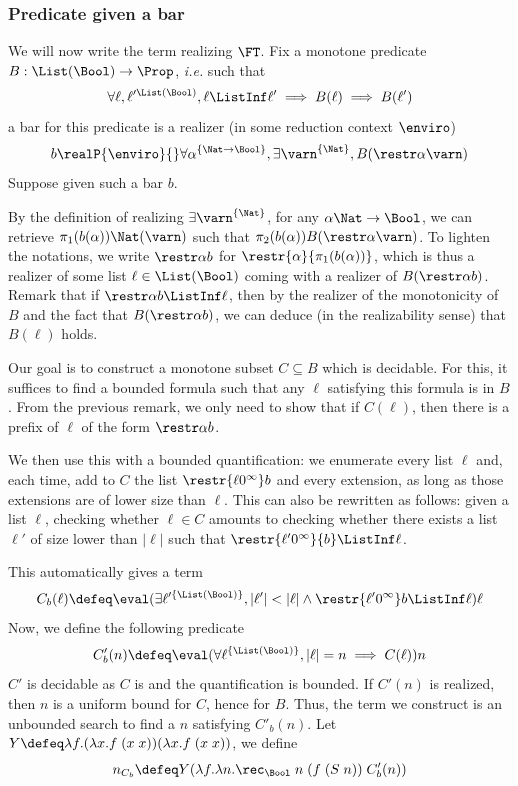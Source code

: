 \subsubsection{Predicate given a bar}

We will now write the term realizing $\FT$.
Fix a monotone predicate $B : \List(\Bool) \to \Prop$, \textit{i.e.} such that
\[\forall \ell, \ell'^{\List(\Bool)}, \ell \ListInf \ell' \implies B(\ell) \implies B(\ell')\]
a bar for this predicate is a realizer (in some reduction context $\enviro$)
\[b \realP{\enviro}{} \forall \alpha^{\{\Nat \to \Bool\}}, \exists \varn^{\{\Nat\}}, B(\restr \alpha \varn)\]
Suppose given such a bar $b$.

By the definition of realizing $\exists \varn^{\{\Nat\}}$, for any $\alpha \real \Nat \to \Bool$, we can retrieve $\pi_1(b(\alpha))\real \Nat(\varn)$ such that $\pi_2(b(\alpha))\real B(\restr \alpha \varn)$. To lighten the notations, we write $\restr\alpha b$ for $\restr{\alpha}{\pi_1(b(\alpha))}$, which is thus a realizer of some list $\ell \in \List(\Bool)$ coming with a realizer of $B(\restr \alpha b)$.
Remark that if $\restr \alpha b\ListInf\ell$, then by the realizer of the monotonicity of $B$ and the fact that $B(\restr \alpha b)$, we can deduce (in the realizability sense) that $B(\ell)$ holds.

Our goal is to construct a monotone subset $C\subseteq B$ which is decidable. For this, it suffices to find a bounded formula such that any $\ell$ satisfying this formula is in $B$. From the previous remark, we only need to show that if $C(\ell)$, then there is a prefix of $\ell$ of the form $\restr\alpha b$.

We then use this with a bounded quantification: we enumerate every list $\ell$ and, each time, add to $C$ the list $\restr{\ell0^\infty} b$ and every extension, as long as those extensions are of lower size than $\ell$. This can also be rewritten as follows: given a list $\ell$, checking whether $\ell \in C$ amounts to checking whether there exists a list $\ell'$ of size lower than $|\ell|$ such that $\restr{\ell'0^\infty}{b}\ListInf \ell$.

This automatically gives a term
\[C_b(\ell) \defeq \eval (\exists \ell'^{\{\List(\Bool)\}}, |\ell'| < |\ell| \land \restr{\ell'0^\infty} b \ListInf \ell)\ell\]
Now, we define the following predicate
\[C'_b(n) \defeq \eval (\forall \ell^{\{\List(\Bool)\}}, |\ell| = n \implies C(\ell))n\]
$C'$ is decidable as $C$ is and the quantification is bounded. If $C'(n)$ is realized, then $n$ is a uniform bound for $C$, hence for $B$. Thus, the term we construct is an unbounded search to find a $n$ satisfying $C'_b(n)$. Let $Y \defeq \lambda f.(\lambda x.f\;(x\;x))(\lambda x.f\;(x\;x))$, we define
\[n_{C_b} \defeq Y(\lambda f.\lambda n.\rec_{\Bool}\;n\;(f\;(S\;n))\;C'_b(n))\]

